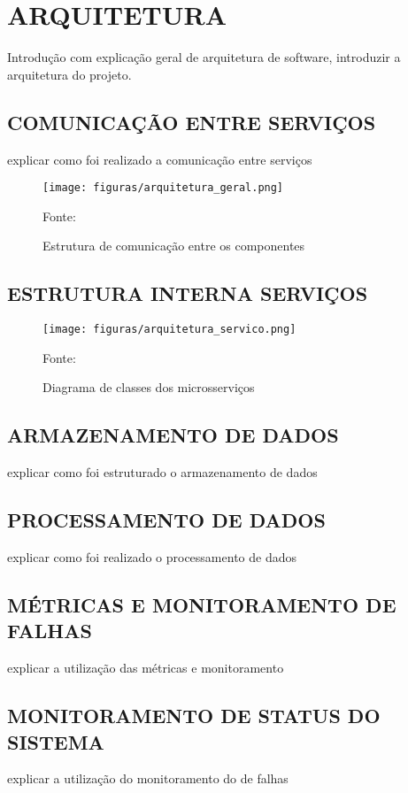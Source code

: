 \chapter{ARQUITETURA}
\label{chp:arquitetura}

Introdução com explicação geral de arquitetura de software, introduzir a
arquitetura do projeto.

\section{COMUNICAÇÃO ENTRE SERVIÇOS}

explicar como foi realizado a comunicação entre serviços

\begin{figure}[H]
	\centering
	\caption{Estrutura de comunicação entre os componentes}
	\texttt{[image: figuras/arquitetura\_geral.png]}

	\label{fig:arch-geral}
	\footnotesize Fonte: \fonteOAutor
\end{figure}

\section{ESTRUTURA INTERNA SERVIÇOS}

\begin{figure}[H]
	\centering
	\caption{Diagrama de classes dos microsserviços}
	\texttt{[image: figuras/arquitetura\_servico.png]}

	\label{fig:arch-servico}
	\footnotesize Fonte: \fonteOAutor
\end{figure}

\section{ARMAZENAMENTO DE DADOS}

explicar como foi estruturado o armazenamento de dados

\section{PROCESSAMENTO DE DADOS}

explicar como foi realizado o processamento de dados

\section{MÉTRICAS E MONITORAMENTO DE FALHAS}

explicar a utilização das métricas e monitoramento

\section{MONITORAMENTO DE STATUS DO SISTEMA}

explicar a utilização do monitoramento do de falhas
